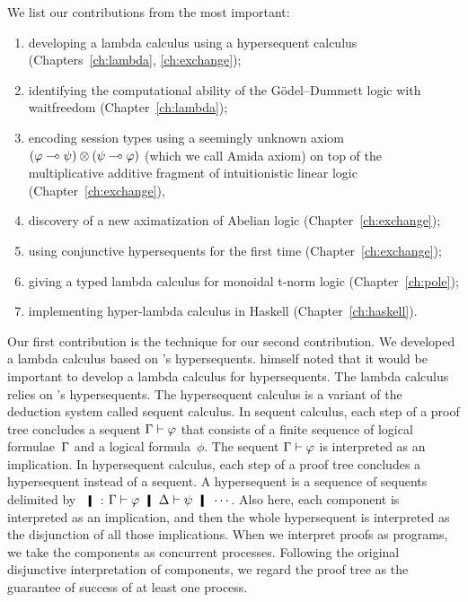 We list our contributions from the most important:
\begin{enumerate}
 \item developing a lambda calculus using
       a hypersequent calculus (Chapters~\ref{ch:lambda}, \ref{ch:exchange});
 \item identifying the computational ability of the
       G\"odel--Dummett logic with waitfreedom (Chapter~\ref{ch:lambda});
 \item encoding session types using a seemingly unknown axiom
       $(\varphi\multimap \psi)\otimes(\psi\multimap \varphi)$ (which we call Amida axiom) on top
       of the multiplicative additive fragment of intuitionistic linear
       logic (Chapter~\ref{ch:exchange}),
 \item discovery of a new aximatization of Abelian logic (Chapter~\ref{ch:exchange});
 \item using conjunctive hypersequents for the first time
       (Chapter~\ref{ch:exchange});
 \item giving a typed lambda calculus for monoidal t-norm logic
       (Chapter~\ref{ch:pole});
 \item implementing hyper-lambda calculus in Haskell (Chapter~\ref{ch:haskell}).
\end{enumerate}

Our first contribution is the technique for our second contribution.
We developed a lambda calculus based on \citet{avron91}'s hypersequents.
\citet{avron91} himself noted that it would be important to develop a
lambda calculus for hypersequents.
The lambda calculus relies on \citet{avron91}'s hypersequents.
The hypersequent calculus is a
variant of the deduction system called sequent calculus.  In sequent
calculus, each step of a proof tree concludes a sequent $\Gamma\vdash\varphi$ that
consists of a finite sequence of logical formulae~$\Gamma$ and a logical
formula~$\phi$.  The sequent $\Gamma\vdash\varphi$ is
interpreted as an implication.  In hypersequent calculus, each step of a
proof tree concludes a hypersequent instead of a sequent.  A
hypersequent is a sequence of sequents delimited by $\hmid$:
$\G\vdash\phi\hmid \D\vdash\psi
\hmid \cdots$.  Also here, each component is interpreted as an
implication, and then the whole hypersequent is interpreted as the
disjunction of all those implications.
When we interpret proofs as programs, we take the components as
concurrent processes.  Following the original disjunctive
interpretation of components, we regard the proof tree as the guarantee of
success of at least one process.

